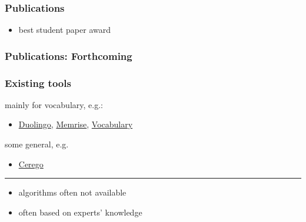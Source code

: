 \documentclass[xcolor=svgnames]{beamer}
\begin{document}
\begin{frame}
	\frametitle{Publications}
	\small
	\vspace{-0.1cm}
	\begin{itemize}
		\item best student paper award
	\end{itemize}

	\medskip

	\medskip
\end{frame}
\begin{frame}
	\frametitle{Publications: Forthcoming}
	\small

	\bigskip

	\bigskip

	\bigskip
\end{frame}
\begin{frame}
\end{frame}
\begin{frame}
	\frametitle{Existing tools}
	mainly for vocabulary, e.g.:
	\begin{itemize}
		\item \href{http://duolingo.com}{Duolingo}, \href{http://memrise.com}{Memrise}, \href{http://vocabulary.com}{Vocabulary}
	\end{itemize}
	some general, e.g.
	\begin{itemize}
		\item \href{http://cerego.com}{Cerego}
	\end{itemize}

	\bigskip
	\hrule

	\bigskip
	\begin{itemize}
		\item algorithms often not available
		\item often based on experts' knowledge
	\end{itemize}
\end{frame}
\end{document}
